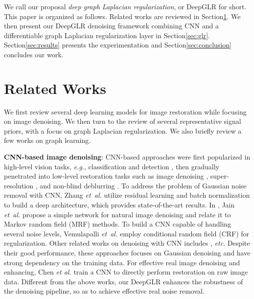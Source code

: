 \documentclass[10pt,twocolumn,letterpaper]{article}
\begin{document}
We call our proposal \emph{deep graph Laplacian regularization}, or DeepGLR for short.
This paper is organized as follows. 
Related works are reviewed in Section\;\ref{sec:related}. 
We then present our DeepGLR denoising framework combining CNN and a differentiable graph Laplacian regularization layer in Section\;\ref{sec:glr}. 
Section\;\ref{sec:results} presents the experimentation and Section\;\ref{sec:conclusion} concludes our work.

\section{Related Works}\label{sec:related}
We first review several deep learning models for image restoration while focusing on image denoising.
We then turn to the review of several representative signal priors, with a focus on graph Laplacian regularization. 
We also briefly review a few works on graph learning.


\textbf{CNN-based image denoising}:
CNN-based approaches were first popularized in high-level vision tasks, {\it e.g.}, classification \cite{krizhevsky2012imagenet} and detection \cite{ouyang2013joint}, then gradually penetrated into low-level restoration tasks such as image denoising \cite{zhang2017beyond}, super-resolution \cite{dong2014learning}, and non-blind deblurring \cite{xu2014deep}. 
To address the problem of Gaussian noise removal with CNN, Zhang {\it et~al.} \cite{zhang2017beyond} utilize residual learning and batch normalization to build a deep architecture, which provides state-of-the-art results.
In \cite{jain2009natural}, Jain {\it et~al.} propose a simple network for natural image denoising and relate it to Markov random field (MRF) methods. 
To build a CNN capable of handling several noise levels, Vemulapalli {\it et~al.} \cite{vemulapalli2016deep} employ conditional random field (CRF) for regularization. 
Other related works on denoising with CNN includes \cite{mao2016image,tai2017memnet,zhang2018ffdnet}, {\it etc}.
Despite their good performance, these approaches focuses on Gaussian denoising and have strong dependency on the training data. 
For effective real image denoising and enhancing, Chen {\it et al.} \cite{chen2018learning} train a CNN to directly  perform restoration on raw image data.
Different from the above works, our DeepGLR enhances the robustness of the denoising pipeline, so as to achieve effective real noise removal.
\end{document}
